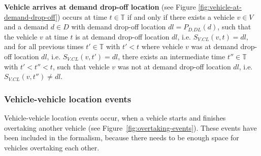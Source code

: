 \documentclass[graybox]{svmult}
\begin{document}
\vspace{2mm}
\noindent \textbf{Vehicle arrives at demand drop-off location} (see Figure \ref{fig:vehicle-at-demand-drop-off}) occurs at time $t \in \mathbb{T}$ if and only if there exists a vehicle $v \in V$ and a demand $d \in D$ with demand drop-off location $dl = P_{D.DL}(d)$, such that the vehicle $v$ at time $t$ is at demand drop-off location $dl$, i.e. $S_{V.CL}(v, t) = dl$, and for all previous times $t' \in \mathbb{T}$ with $t' < t$ where vehicle $v$ was at demand drop-off location $dl$, i.e. $S_{V.CL}(v, t') = dl$, there exists an intermediate time $t'' \in \mathbb{T}$ with $t' < t'' < t$, such that vehicle $v$ was not at demand drop-off location $dl$, i.e. $S_{V.CL}(v, t'') \neq dl$.

\subsubsection{Vehicle-vehicle location events}
\label{sec:vehicle-location-events}

Vehicle-vehicle location events occur, when a vehicle starts and finishes overtaking another vehicle (see Figure~\ref{fig:overtaking-events}).
These events have been included in the formalism, because there needs to be enough space for vehicles overtaking each other. 
\end{document}
